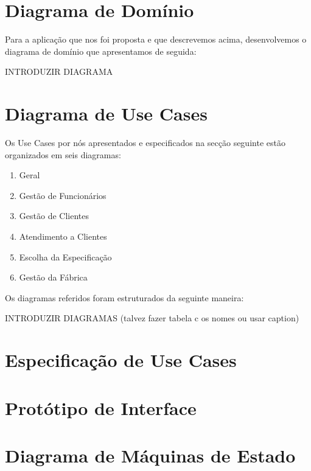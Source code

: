\documentclass[11pt]{article} %
\begin{document}
\section{Diagrama de Domínio}
Para a aplicação que nos foi proposta e que descrevemos acima, desenvolvemos o diagrama de domínio que apresentamos de seguida:

INTRODUZIR DIAGRAMA


\section{Diagrama de Use Cases}
Os Use Cases por nós apresentados e especificados na secção seguinte estão organizados em seis diagramas:
\begin{enumerate}
	\item Geral
	\item Gestão de Funcionários
	\item Gestão de Clientes
	\item Atendimento a Clientes
	\item Escolha da Especificação
	\item Gestão da Fábrica
\end{enumerate}
Os diagramas referidos foram estruturados da seguinte maneira:

INTRODUZIR DIAGRAMAS (talvez fazer tabela c os nomes ou usar caption)

\section{Especificação de Use Cases}

\section{Protótipo de Interface}

\section{Diagrama de Máquinas de Estado}
\end{document}
